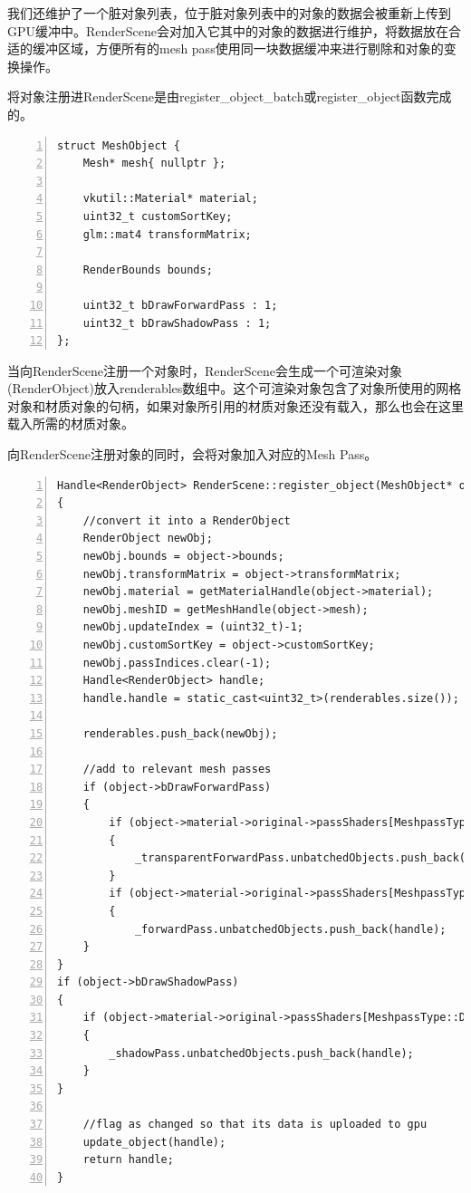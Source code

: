 \documentclass{ctexart}
\begin{document}
我们还维护了一个脏对象列表，位于脏对象列表中的对象的数据会被重新上传到GPU缓冲中。RenderScene会对加入它其中的对象的数据进行维护，将数据放在合适的缓冲区域，方便所有的mesh pass使用同一块数据缓冲来进行剔除和对象的变换操作。

将对象注册进RenderScene是由register\_object\_batch或register\_object函数完成的。

\begin{lstlisting}[language={[ANSI]C},keywordstyle=\color{blue!70},commentstyle=\color{red!50!green!50!blue!50},frame=shadowbox, rulesepcolor=\color{red!20!green!20!blue!20},basicstyle=\small,numbers=left, numberstyle=\tiny,breaklines=true]
struct MeshObject {
	Mesh* mesh{ nullptr };

	vkutil::Material* material;
	uint32_t customSortKey;
	glm::mat4 transformMatrix;

	RenderBounds bounds;

	uint32_t bDrawForwardPass : 1;
	uint32_t bDrawShadowPass : 1;
};
\end{lstlisting}

当向RenderScene注册一个对象时，RenderScene会生成一个可渲染对象(RenderObject)放入renderables数组中。这个可渲染对象包含了对象所使用的网格对象和材质对象的句柄，如果对象所引用的材质对象还没有载入，那么也会在这里载入所需的材质对象。

向RenderScene注册对象的同时，会将对象加入对应的Mesh Pass。

\begin{lstlisting}[language={[ANSI]C},keywordstyle=\color{blue!70},commentstyle=\color{red!50!green!50!blue!50},frame=shadowbox, rulesepcolor=\color{red!20!green!20!blue!20},basicstyle=\small,numbers=left, numberstyle=\tiny,breaklines=true]
Handle<RenderObject> RenderScene::register_object(MeshObject* object)
{
	//convert it into a RenderObject
	RenderObject newObj;
	newObj.bounds = object->bounds;
	newObj.transformMatrix = object->transformMatrix;
	newObj.material = getMaterialHandle(object->material);
	newObj.meshID = getMeshHandle(object->mesh);
	newObj.updateIndex = (uint32_t)-1;
	newObj.customSortKey = object->customSortKey;
	newObj.passIndices.clear(-1);
	Handle<RenderObject> handle;
	handle.handle = static_cast<uint32_t>(renderables.size());

	renderables.push_back(newObj);

	//add to relevant mesh passes
	if (object->bDrawForwardPass)
	{
		if (object->material->original->passShaders[MeshpassType::Transparency])
		{
			_transparentForwardPass.unbatchedObjects.push_back(handle);
		}
		if (object->material->original->passShaders[MeshpassType::Forward])
		{
			_forwardPass.unbatchedObjects.push_back(handle);
	}
}
if (object->bDrawShadowPass)
{
	if (object->material->original->passShaders[MeshpassType::DirectionalShadow])
	{
		_shadowPass.unbatchedObjects.push_back(handle);
	}
}

	//flag as changed so that its data is uploaded to gpu
	update_object(handle);
	return handle;
}
\end{lstlisting}
\end{document}
